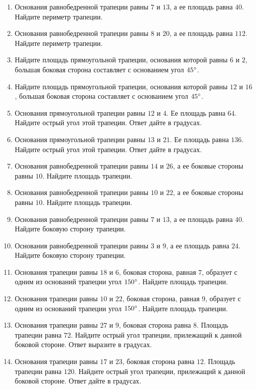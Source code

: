 \documentclass[12pt, a4paper]{article}
\begin{document}
\begin{enumerate}
		\item Основания равнобедренной трапеции равны \( 7  \) и \( 13 \), а ее площадь равна \( 40 \). Найдите периметр трапеции.
		\item Основания равнобедренной трапеции равны \( 8  \) и \( 20 \), а ее площадь равна \( 112 \). Найдите периметр трапеции.
		\item Найдите площадь прямоугольной трапеции, основания которой равны \( 6  \) и  \( 2 \), большая боковая сторона составляет с основанием угол \( 45\degree \).
		\item Найдите площадь прямоугольной трапеции, основания которой равны \( 12  \) и \( 16 \), большая боковая сторона составляет с основанием угол \( 45 \degree\).
		\item Основания прямоугольной трапеции равны \( 12  \) и \( 4 \). Ее площадь равна \( 64 \). Найдите острый угол этой трапеции. Ответ дайте в градусах.
		\item Основания прямоугольной трапеции равны \( 13  \) и \( 21 \). Ее площадь равна \( 136 \). Найдите острый угол этой трапеции. Ответ дайте в градусах.
		\item Основания равнобедренной трапеции равны \( 14  \) и \( 26 \), а ее боковые стороны равны \( 10 \). Найдите площадь трапеции.
		\item Основания равнобедренной трапеции равны \( 10  \) и \( 22 \), а ее боковые стороны равны \( 10 \). Найдите площадь трапеции.
		\item Основания равнобедренной трапеции равны \( 7  \) и \( 13 \), а ее площадь равна \( 40 \). Найдите боковую сторону трапеции.
		\item  Основания равнобедренной трапеции равны \( 3  \) и \( 9 \), а ее площадь равна \( 24 \). Найдите боковую сторону трапеции.
		\item Основания трапеции равны \( 18  \) и \( 6 \), боковая сторона, равная \( 7 \), образует с одним из оснований трапеции угол \( 150\degree\). Найдите площадь трапеции.
		\item Основания трапеции равны \( 10  \) и \( 22 \), боковая сторона, равная \( 9 \), образует с одним из оснований трапеции угол \( 150 \degree \). Найдите площадь трапеции.
		\item Основания трапеции равны \( 27  \) и \( 9 \), боковая сторона равна \( 8 \). Площадь трапеции равна \( 72 \). Найдите острый угол трапеции, прилежащий к данной боковой стороне. Ответ выразите в градусах.
		\item Основания трапеции равны \( 17  \) и \( 23 \), боковая сторона равна \( 12 \). Площадь трапеции равна \( 120 \). Найдите острый угол трапеции, прилежащий к данной боковой стороне. Ответ дайте в градусах.

\end{enumerate}
\end{document}
